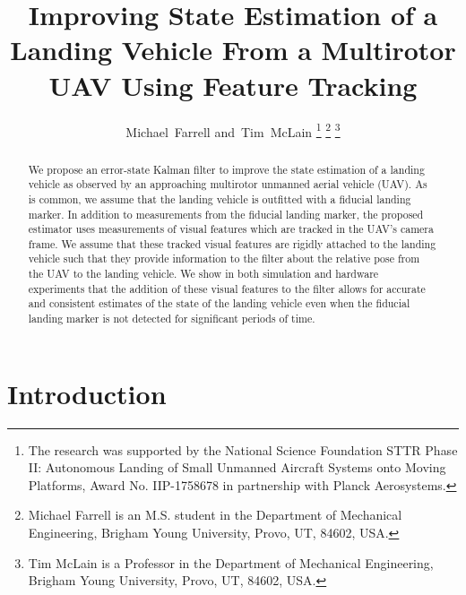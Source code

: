 \documentclass[journal]{IEEEtran}
\begin{document}
\title{Improving State Estimation of a Landing Vehicle From a Multirotor UAV
Using Feature Tracking}

\author{Michael~Farrell
        and~Tim~McLain
\thanks{The research was supported by the National Science Foundation STTR Phase II: Autonomous Landing of Small Unmanned Aircraft Systems onto Moving Platforms, Award No. IIP-1758678 in partnership with Planck Aerosystems.}
\thanks{Michael Farrell is an M.S. student in the Department of Mechanical
Engineering, Brigham Young University, Provo, UT, 84602, USA.}%
\thanks{Tim McLain is a Professor in the Department of Mechanical
Engineering, Brigham Young University, Provo, UT, 84602, USA.}%
}

\maketitle

\begin{abstract}
  We propose an error-state Kalman filter to improve the state estimation of a
  landing vehicle as observed by an approaching multirotor unmanned aerial
  vehicle (UAV). As is common, we
  assume that the landing vehicle is outfitted with a fiducial landing marker.
  In addition to measurements from the fiducial landing marker, the proposed
  estimator uses measurements of visual features which are tracked in the UAV's
  camera frame. We assume that these tracked visual features are rigidly
  attached to the landing vehicle such that they provide information to the
  filter about the relative pose from the UAV to the landing vehicle. We show
  in both simulation and hardware experiments that the addition of these visual
  features to the filter allows for accurate and consistent estimates of the
  state of the landing vehicle even when the fiducial landing marker is not
  detected for significant periods of time.
\end{abstract}

\section{Introduction} \label{sec:intro}

% 

\end{document}
